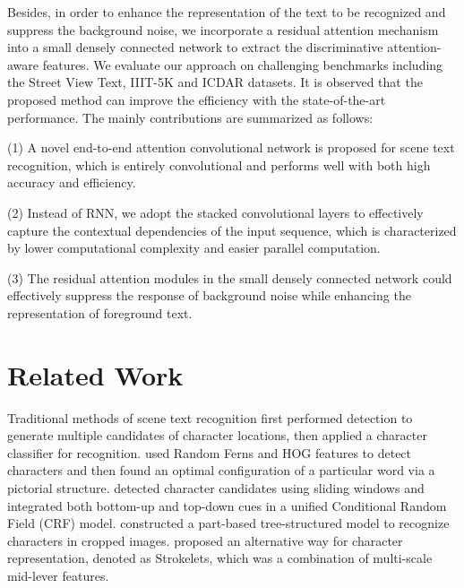 \documentclass[letterpaper]{article} %
\begin{document}
Besides, in order to enhance the representation of the text to be recognized and suppress the background noise, we incorporate a residual attention mechanism into a small densely connected network to extract the discriminative attention-aware features. We evaluate our approach on challenging benchmarks including the Street View Text, IIIT-5K and ICDAR datasets. It is observed that the proposed method can improve the efficiency with the state-of-the-art performance. The mainly contributions are summarized as follows:\par
(1) A novel end-to-end attention convolutional network is proposed for scene text recognition, which is entirely convolutional and performs well with both high accuracy and efficiency.\par
(2) Instead of RNN, we adopt the stacked convolutional layers to effectively capture the contextual dependencies of the input sequence, which is characterized by lower computational complexity and easier parallel computation.\par
(3) The residual attention modules in the small densely connected network could effectively suppress the response of background noise while enhancing the representation of foreground text.

\section{Related Work}

Traditional methods of scene text recognition first performed detection to generate multiple candidates of character locations, then applied a character classifier for recognition. \cite{wang2011end} used Random Ferns and HOG features to detect characters and then found an optimal configuration of a particular word via a pictorial structure. \cite{mishra2012top} detected character candidates using sliding windows and integrated both bottom-up and top-down cues in a unified Conditional Random Field (CRF) model. \cite{shi2013scene} constructed a part-based tree-structured model to recognize characters in cropped images. \cite{yao2014strokelets} proposed an alternative way for character representation, denoted as Strokelets, which was a combination of multi-scale mid-lever features.\par
\end{document}
